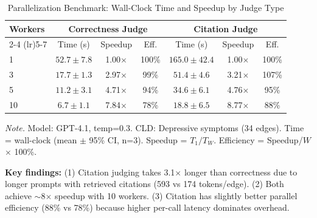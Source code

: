 \begin{table}[H]
\centering
\caption{Parallelization Benchmark: Wall-Clock Time and Speedup by Judge Type}
\label{tab:parallelization}
\begin{threeparttable}
\begin{tabular}{lcccccc}
\toprule
\textbf{Workers} & \multicolumn{3}{c}{\textbf{Correctness Judge}} & \multicolumn{3}{c}{\textbf{Citation Judge}} \\
\cmidrule(lr){2-4} \cmidrule(lr){5-7}
 & Time (s) & Speedup & Eff. & Time (s) & Speedup & Eff. \\
\midrule
1 & $52.7 \pm 7.8$ & 1.00$\times$ & 100\% & $165.0 \pm 42.4$ & 1.00$\times$ & 100\% \\
3 & $17.7 \pm 1.3$ & 2.97$\times$ & 99\% & $51.4 \pm 4.6$ & 3.21$\times$ & 107\% \\
5 & $11.2 \pm 3.1$ & 4.71$\times$ & 94\% & $34.6 \pm 6.1$ & 4.76$\times$ & 95\% \\
10 & $6.7 \pm 1.1$ & 7.84$\times$ & 78\% & $18.8 \pm 6.5$ & 8.77$\times$ & 88\% \\
\bottomrule
\end{tabular}
\begin{tablenotes}
\small
\item \textit{Note.} Model: GPT-4.1, temp=0.3. CLD: Depressive symptoms (34 edges). Time = wall-clock (mean $\pm$ 95\% CI, n=3). Speedup = $T_1/T_W$. Efficiency = Speedup/$W$ $\times$ 100\%.
\item \textbf{Key findings:} (1) Citation judging takes 3.1$\times$ longer than correctness due to longer prompts with retrieved citations (593 vs 174 tokens/edge). (2) Both achieve $\sim$8$\times$ speedup with 10 workers. (3) Citation has slightly better parallel efficiency (88\% vs 78\%) because higher per-call latency dominates overhead.
\end{tablenotes}
\end{threeparttable}
\end{table}
